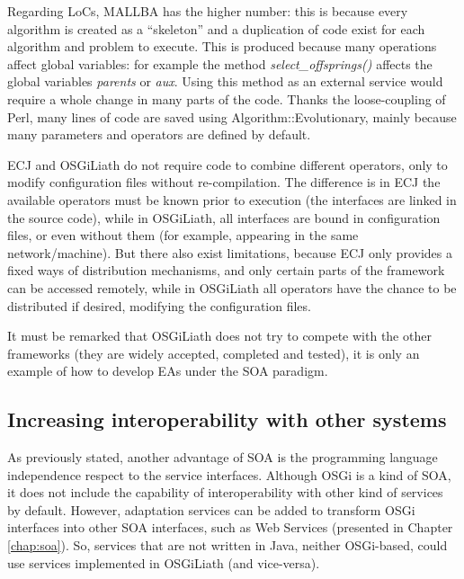 Regarding LoCs, MALLBA has the higher number: this is because every
algorithm is created as a ``skeleton'' and a duplication of code exist
for each algorithm and problem to execute. This is produced because
many operations affect global variables: for example the method {\em
  select\_offsprings()} affects the global variables {\em parents} or
{\em aux}. Using this method as an external service would require a
whole change in many parts of the code. Thanks the loose-coupling of
Perl, many lines of code are saved using Algorithm::Evolutionary,
mainly because many parameters and operators are defined by default. 



ECJ and OSGiLiath do not require code to combine different operators,
only to modify configuration files without re-compilation. %
The difference is in ECJ the available operators must be known prior
to execution (the interfaces are linked in the source code), while in
OSGiLiath, all interfaces are bound in configuration files, or even
without them (for example, appearing in the same network/machine). But
there also exist limitations, because ECJ only provides a fixed ways
of distribution mechanisms, and only certain parts of the framework
can be accessed remotely, while in OSGiLiath all operators have the
chance to be distributed if desired, modifying the configuration
files. 


It must be remarked that OSGiLiath does not try to compete with the
other frameworks (they are widely accepted, completed and tested), it
is only an example of how to develop EAs under the SOA paradigm. %

\subsection{Increasing interoperability with other systems}

As previously stated, another advantage of SOA is the programming
language independence respect to the service interfaces. Although OSGi
is a kind of SOA, it does not include  the capability of
interoperability with other kind of services by default. However,
adaptation services can be added to transform OSGi interfaces into
other SOA interfaces, such as Web Services (presented in Chapter
\ref{chap:soa}). So, services that are not written in Java, neither
OSGi-based, could use services implemented in OSGiLiath (and
vice-versa). 



